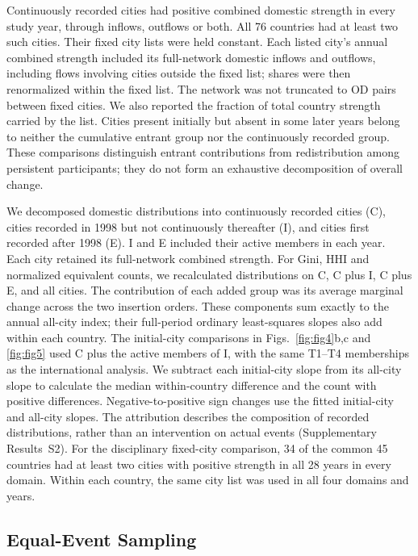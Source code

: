 Continuously recorded cities had positive combined domestic strength in every study year, through inflows, outflows or both. All 76 countries had at least two such cities. Their fixed city lists were held constant. Each listed city's annual combined strength included its full-network domestic inflows and outflows, including flows involving cities outside the fixed list; shares were then renormalized within the fixed list. The network was not truncated to OD pairs between fixed cities. We also reported the fraction of total country strength carried by the list. Cities present initially but absent in some later years belong to neither the cumulative entrant group nor the continuously recorded group. These comparisons distinguish entrant contributions from redistribution among persistent participants; they do not form an exhaustive decomposition of overall change.

We decomposed domestic distributions into continuously recorded cities (C), cities recorded in 1998 but not continuously thereafter (I), and cities first recorded after 1998 (E). I and E included their active members in each year. Each city retained its full-network combined strength. For Gini, HHI and normalized equivalent counts, we recalculated distributions on C, C plus I, C plus E, and all cities. The contribution of each added group was its average marginal change across the two insertion orders. These components sum exactly to the annual all-city index; their full-period ordinary least-squares slopes also add within each country. The initial-city comparisons in Figs.~\ref{fig:fig4}b,c and \ref{fig:fig5} used C plus the active members of I, with the same T1--T4 memberships as the international analysis. We subtract each initial-city slope from its all-city slope to calculate the median within-country difference and the count with positive differences. Negative-to-positive sign changes use the fitted initial-city and all-city slopes. The attribution describes the composition of recorded distributions, rather than an intervention on actual events (Supplementary Results~S2). For the disciplinary fixed-city comparison, 34 of the common 45 countries had at least two cities with positive strength in all 28 years in every domain. Within each country, the same city list was used in all four domains and years.

\subsection{Equal-Event Sampling}

